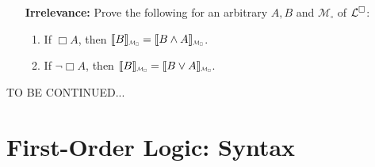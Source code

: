 \documentclass[a4paper, 11pt]{article} %
\begin{document}
\begin{enumerate}[leftmargin=1.2in]
\begin{enumerate}[label=(\arabic*),resume]
\begin{multicols}{2}
		      \end{multicols}
	      \end{enumerate}
	\item[\bf Irrelevance:] Prove the following for an arbitrary $A,B$ and $\mathcal{M}_\square$ of $\mathcal{L}^{\square}$:
	      \begin{enumerate}[label=(\arabic*),resume]\small
		      \item If $\Box A$, then $\interpret{B}_{\Scale[0.5]{\mathcal{M}_\square}}=\interpret{B\wedge A}_{\Scale[0.5]{\mathcal{M}_\square}}$.
		      \item If $\neg\Box A$, then $\interpret{B}_{\Scale[0.5]{\mathcal{M}_\square}}=\interpret{B\vee A}_{\Scale[0.5]{\mathcal{M}_\square}}$.
	      \end{enumerate}
\end{enumerate}


\pagebreak
\noindent
TO BE CONTINUED...
\pagebreak





\section*{\sc First-Order Logic: Syntax}
\end{document}
